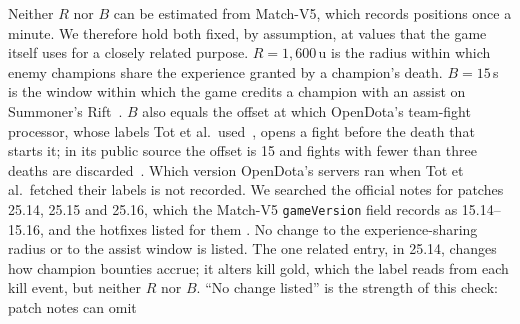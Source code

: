 Neither $R$ nor $B$ can be estimated from Match-V5, which records positions once a minute. We therefore
hold both fixed, by assumption, at values that the game itself uses for a closely related purpose.
$R = 1{,}600$\,u is the radius within which enemy champions share the experience granted by a champion's
death. $B = 15$\,s is the window within which the game credits a champion with an assist on Summoner's
Rift~\cite{lolwiki2026experience,lolwiki2026assist}.
$B$ also equals the offset at which OpenDota's team-fight processor, whose labels Tot et
al.\ used~\cite{tot2021camera}, opens a fight before the death that starts it; in its public source the
offset is 15 and fights with fewer than three deaths are discarded~\cite{opendota2018processteamfights}.
Which version OpenDota's servers ran when Tot et al.\ fetched their labels is not recorded.
We searched the official notes for patches 25.14, 25.15 and 25.16, which the Match-V5 \texttt{gameVersion}
field records as 15.14--15.16, and the hotfixes listed for them
\cite{riot2025patch2514,riot2025patch2515,riot2025patch2516,lolwiki2026v2514,lolwiki2026v2515,lolwiki2026v2516}.
No change to the experience-sharing radius or to the assist window is listed. The one related entry, in
25.14, changes how champion bounties accrue; it alters kill gold, which the label reads from each kill
event, but neither $R$ nor $B$. ``No change listed'' is the strength of this check: patch notes can omit
